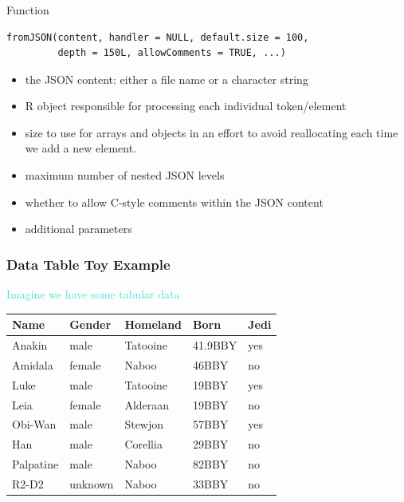 \documentclass{beamer}\usepackage[]{graphicx}\usepackage[]{color}
\begin{document}
\begin{frame}[fragile]
\frametitle{}

\begin{block}{Function }
\begin{verbatim}
fromJSON(content, handler = NULL, default.size = 100,
         depth = 150L, allowComments = TRUE, ...)
\end{verbatim}

\begin{itemize}
 \item {} the JSON content: either a file name or a character string
 \item {} R object responsible for processing each individual token/element
 \item {} size to use for arrays and objects in an effort to avoid reallocating each time we add a new element.
 \item {} maximum number of nested JSON levels
 \item {} whether to allow C-style comments within the JSON content
 \item {} additional parameters
\end{itemize}
\end{block}

\end{frame}


\begin{frame}[fragile]
\frametitle{Data Table Toy Example}

\begin{center}
\textcolor{turquoise}{Imagine we have some tabular data}
\end{center}

\begin{center}
 \begin{tabular}{l l l l l}
  \hline
  Name & Gender & Homeland & Born & Jedi \\
  \hline
  Anakin & male & Tatooine & 41.9BBY & yes \\  
  Amidala & female & Naboo & 46BBY & no \\
  Luke & male & Tatooine & 19BBY & yes \\
  Leia & female & Alderaan & 19BBY & no \\
  Obi-Wan & male & Stewjon & 57BBY & yes \\
  Han & male & Corellia & 29BBY & no \\
  Palpatine & male & Naboo & 82BBY & no \\
  R2-D2 & unknown & Naboo & 33BBY & no \\
  \hline
 \end{tabular}
\end{center}

\end{frame}
\end{document}
